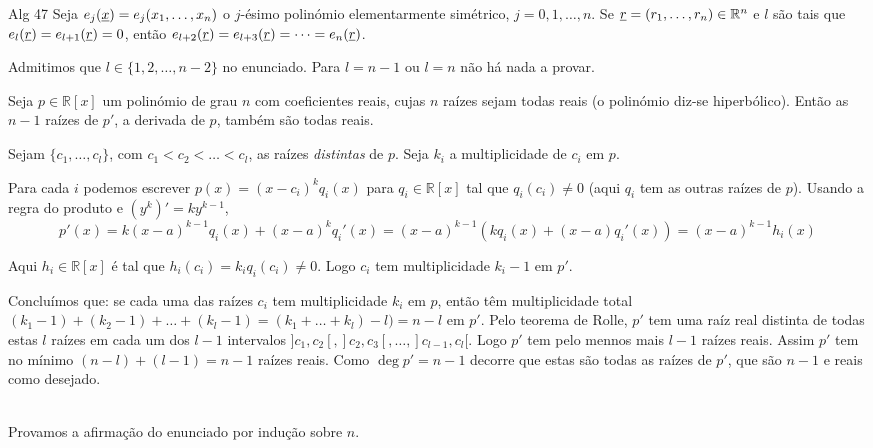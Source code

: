 \documentclass[repertorio-solutions-1.tex]{subfiles}
\renewcommand*{\u}[1]{\ensuremath{\uline{#1}}}
\begin{document}
\begin{problem}{Alg 47}
Seja $e_j(\u{x})=e_j(x_1,\dots,x_n)$ o $j$-ésimo polinómio elementarmente
simétrico, $j=0,1,\dots,n$.
Se $\u{r}=(r_1,\dots,r_n)\in\mathbb{R}^n$ e $l$ são tais que
$e_l(\u{r})=e_{l+1}(\u{r})=0$, então
$e_{l+2}(\u{r})=e_{l+3}(\u{r})=\dots=e_n(\u{r})$.
\end{problem}

\begin{solution}
Admitimos que $l\in\{1,2,\dots,n-2\}$ no enunciado.
Para $l=n-1$ ou $l=n$ não há nada a provar.
\\

\begin{lemma}
Seja $p\in\mathbb{R}[x]$ um polinómio de grau $n$ com coeficientes reais,
cujas $n$ raízes sejam todas reais (o polinómio diz-se hiperbólico).
Então as $n-1$ raízes de $p'$, a derivada de $p$, também são todas reais.

\begin{quickproof}
Sejam $\{c_1,\dots,c_l\}$, com $c_1<c_2<\dots<c_l$,
as raízes \emph{distintas} de $p$.
Seja $k_i$ a multiplicidade de $c_i$ em $p$.

Para cada $i$ podemos escrever $p(x)=(x-c_i)^k q_i(x)$
para $q_i\in\mathbb{R}[x]$ tal que $q_i(c_i)\neq 0$
(aqui $q_i$ tem as outras raízes de $p$).
Usando a regra do produto e $(y^k)'=ky^{k-1}$,
\begin{equation*}
p'(x)=k(x-a)^{k-1} q_i(x)+(x-a)^kq_i'(x)
=(x-a)^{k-1}(kq_i(x)+(x-a)q_i'(x))
=(x-a)^{k-1}h_i(x)
\end{equation*}

Aqui $h_i\in\mathbb{R}[x]$ é tal que $h_i(c_i)=k_iq_i(c_i)\neq 0$.
Logo $c_i$ tem multiplicidade $k_i-1$ em $p'$.

Concluímos que: se cada uma das raízes $c_i$ tem multiplicidade $k_i$ em $p$,
então têm multiplicidade total
$(k_1-1)+(k_2-1)+\dots+(k_l-1)=(k_1+\dots+k_l)-l)=n-l$ em $p'$.
Pelo teorema de Rolle, $p'$ tem uma raíz real distinta de todas estas $l$
raízes em cada um dos $l-1$ intervalos $]c_1,c_2[,]c_2,c_3[,\dots,]c_{l-1},c_l[$.
Logo $p'$ tem pelo mennos mais $l-1$ raízes reais.
Assim $p'$ tem no mínimo $(n-l)+(l-1)=n-1$ raízes reais.
Como $\deg p'=n-1$ decorre que estas são todas as raízes de $p'$,
que são $n-1$ e reais como desejado.
\end{quickproof}
\end{lemma}
\\

Provamos a afirmação do enunciado por indução sobre $n$.


\end{solution}
\end{document}
